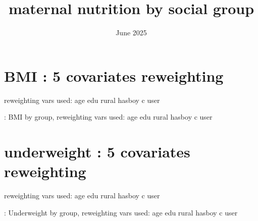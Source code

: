 \documentclass{article}
\title{maternal nutrition by social group}
\date{June 2025}
\begin{document}
\maketitle


\section{BMI : 5 covariates reweighting }

reweighting vars used: age edu rural hasboy c user

\begin{table}[H]
    \centering
    \footnotesize %
    \caption{: BMI by group, reweighting vars used: age edu rural hasboy c user}
    \label{tab:sumstat}
\end{table}


\section{underweight : 5 covariates reweighting }

reweighting vars used: age edu rural hasboy c user

\begin{table}[H]
    \centering
    \footnotesize %
    \caption{: Underweight by group, reweighting vars used: age edu rural hasboy c user}
    \label{tab:sumstat}
\end{table}




\end{document}
